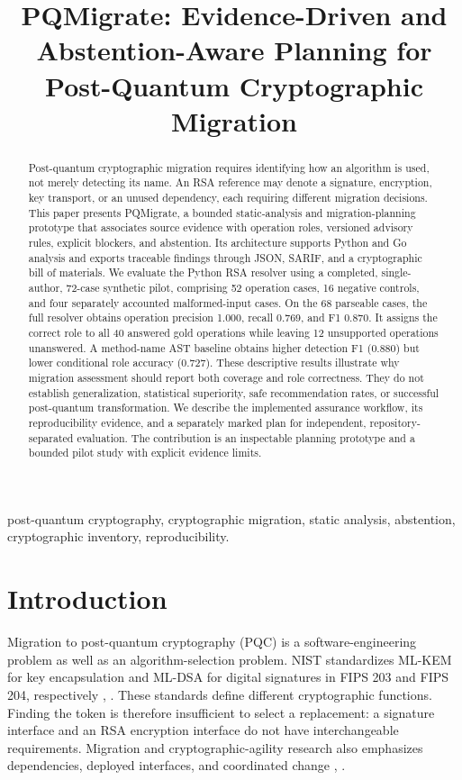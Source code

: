 \documentclass[conference,a4paper]{IEEEtran}
\title{PQMigrate: Evidence-Driven and Abstention-Aware Planning for Post-Quantum Cryptographic Migration}
\author{\IEEEauthorblockN{Deepak Uplaonkar, Ratnesh Patnaik, Saravanan Kumar, Vaibhavi Shah, and Prince Ostwal}\IEEEauthorblockA{Internal review manuscript --- 4 October 2026\\Affiliations and corresponding-author email pending}}
\begin{document}
\maketitle
\begin{abstract}

Post-quantum cryptographic migration requires identifying how an algorithm is used, not merely detecting its name. An RSA reference may denote a signature, encryption, key transport, or an unused dependency, each requiring different migration decisions. This paper presents PQMigrate, a bounded static-analysis and migration-planning prototype that associates source evidence with operation roles, versioned advisory rules, explicit blockers, and abstention. Its architecture supports Python and Go analysis and exports traceable findings through JSON, SARIF, and a cryptographic bill of materials. We evaluate the Python RSA resolver using a completed, single-author, 72-case synthetic pilot, comprising 52 operation cases, 16 negative controls, and four separately accounted malformed-input cases. On the 68 parseable cases, the full resolver obtains operation precision 1.000, recall 0.769, and F1 0.870. It assigns the correct role to all 40 answered gold operations while leaving 12 unsupported operations unanswered. A method-name AST baseline obtains higher detection F1 (0.880) but lower conditional role accuracy (0.727). These descriptive results illustrate why migration assessment should report both coverage and role correctness. They do not establish generalization, statistical superiority, safe recommendation rates, or successful post-quantum transformation. We describe the implemented assurance workflow, its reproducibility evidence, and a separately marked plan for independent, repository-separated evaluation. The contribution is an inspectable planning prototype and a bounded pilot study with explicit evidence limits.

\end{abstract}
\begin{IEEEkeywords}
post-quantum cryptography, cryptographic migration, static analysis, abstention, cryptographic inventory, reproducibility.
\end{IEEEkeywords}

\section{Introduction}

Migration to post-quantum cryptography (PQC) is a software-engineering problem as well as an algorithm-selection problem. NIST standardizes ML-KEM for key encapsulation and ML-DSA for digital signatures in FIPS 203 and FIPS 204, respectively \cite{ref1}, \cite{ref2}. These standards define different cryptographic functions. Finding the token  is therefore insufficient to select a replacement: a signature interface and an RSA encryption interface do not have interchangeable requirements. Migration and cryptographic-agility research also emphasizes dependencies, deployed interfaces, and coordinated change \cite{ref3}, \cite{ref4}.
\end{document}

